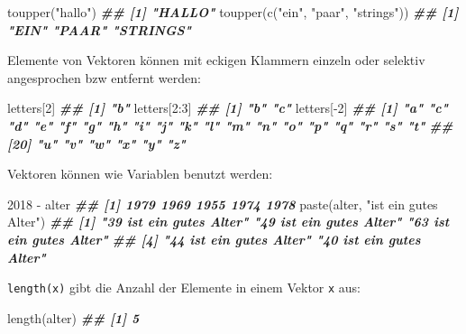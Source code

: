 \documentclass[
  ngerman,
]{article}
\newenvironment{Shaded}{\begin{snugshade}}{\end{snugshade}}
\newcommand{\DecValTok}[1]{\textcolor[rgb]{0.00,0.00,0.81}{#1}}
\newcommand{\DocumentationTok}[1]{\textcolor[rgb]{0.56,0.35,0.01}{\textbf{\textit{#1}}}}
\newcommand{\FunctionTok}[1]{\textcolor[rgb]{0.00,0.00,0.00}{#1}}
\newcommand{\NormalTok}[1]{#1}
\newcommand{\SpecialCharTok}[1]{\textcolor[rgb]{0.00,0.00,0.00}{#1}}
\newcommand{\StringTok}[1]{\textcolor[rgb]{0.31,0.60,0.02}{#1}}
\begin{document}
\begin{Shaded}
\begin{Highlighting}[]
\FunctionTok{toupper}\NormalTok{(}\StringTok{"hallo"}\NormalTok{)}
\DocumentationTok{\#\# [1] "HALLO"}
\FunctionTok{toupper}\NormalTok{(}\FunctionTok{c}\NormalTok{(}\StringTok{"ein"}\NormalTok{, }\StringTok{"paar"}\NormalTok{, }\StringTok{"strings"}\NormalTok{))}
\DocumentationTok{\#\# [1] "EIN"     "PAAR"    "STRINGS"}
\end{Highlighting}
\end{Shaded}

Elemente von Vektoren können mit eckigen Klammern einzeln oder selektiv angesprochen bzw entfernt werden:

\begin{Shaded}
\begin{Highlighting}[]
\NormalTok{letters[}\DecValTok{2}\NormalTok{]}
\DocumentationTok{\#\# [1] "b"}
\NormalTok{letters[}\DecValTok{2}\SpecialCharTok{:}\DecValTok{3}\NormalTok{]}
\DocumentationTok{\#\# [1] "b" "c"}
\NormalTok{letters[}\SpecialCharTok{{-}}\DecValTok{2}\NormalTok{]}
\DocumentationTok{\#\#  [1] "a" "c" "d" "e" "f" "g" "h" "i" "j" "k" "l" "m" "n" "o" "p" "q" "r" "s" "t"}
\DocumentationTok{\#\# [20] "u" "v" "w" "x" "y" "z"}
\end{Highlighting}
\end{Shaded}

Vektoren können wie Variablen benutzt werden:

\begin{Shaded}
\begin{Highlighting}[]
\DecValTok{2018} \SpecialCharTok{{-}}\NormalTok{ alter}
\DocumentationTok{\#\# [1] 1979 1969 1955 1974 1978}
\FunctionTok{paste}\NormalTok{(alter, }\StringTok{"ist ein gutes Alter"}\NormalTok{)}
\DocumentationTok{\#\# [1] "39 ist ein gutes Alter" "49 ist ein gutes Alter" "63 ist ein gutes Alter"}
\DocumentationTok{\#\# [4] "44 ist ein gutes Alter" "40 ist ein gutes Alter"}
\end{Highlighting}
\end{Shaded}

\texttt{length(x)} gibt die Anzahl der Elemente in einem Vektor \texttt{x} aus:

\begin{Shaded}
\begin{Highlighting}[]
\FunctionTok{length}\NormalTok{(alter)}
\DocumentationTok{\#\# [1] 5}
\end{Highlighting}
\end{Shaded}
\end{document}
